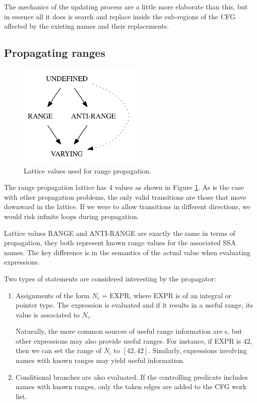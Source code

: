 The mechanics of the updating process are a little more
elaborate than this, but in essence all it does is search and
replace inside the sub-regions of the CFG affected by the
existing names and their replacements.

\subsection{Propagating ranges}

\begin{figure}
    \centering
    \parbox{2in}{\includegraphics[height=2in]{vrp-4}}
    \caption{Lattice values used for range propagation.}
    \label{novillo:fig:vrp-lattice}
\end{figure}

The range propagation lattice has 4 values as shown in Figure
\ref{novillo:fig:vrp-lattice}.  As is the case with other
propagation problems, the only valid transitions are those that
move downward in the lattice.  If we were to allow transitions in
different directions, we would risk infinite loops during
propagation.

Lattice values \textsc{RANGE} and \textsc{ANTI-RANGE} are exactly
the same in terms of propagation, they both represent known
range values for the associated SSA names.  The key difference is
in the semantics of the actual value when evaluating expressions.

Two types of statements are considered interesting by the
propagator:

\begin{enumerate}
\item	Assignments of the form $N_i$ = EXPR, where EXPR is of
	an integral or pointer type.  The expression is evaluated
	and if it results in a useful range, its value is
	associated to $N_i$.

	Naturally, the more common sources of useful range
	information are s, but other
	expressions may also provide useful ranges.  For
	instance, if EXPR is $42$, then we can set the range of
	$N_i$ to $[42, 42]$.  Similarly, expressions involving
	names with known ranges may yield useful information.

\item	Conditional branches are also evaluated.  If the
	controlling predicate includes names with known ranges,
	only the taken edges are added to the CFG work list.
\end{enumerate}


